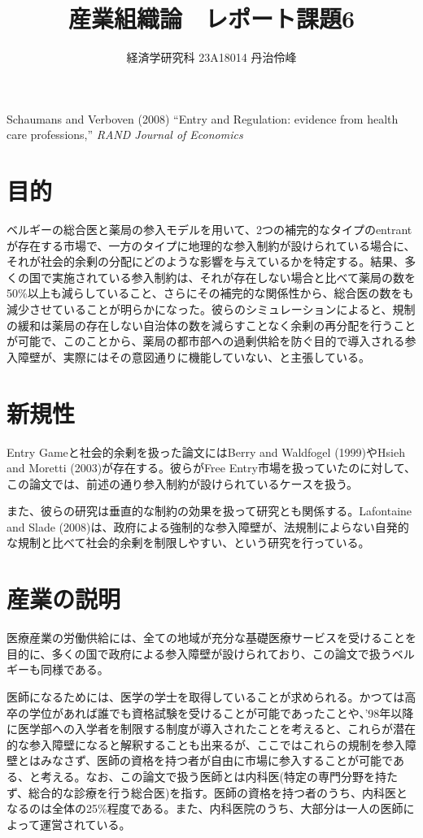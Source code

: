 \documentclass[11pt]{jsarticle}
\begin{document}
\title{産業組織論　レポート課題6}
\author{経済学研究科 23A18014 丹治伶峰}
\date{}
\maketitle

\large
Schaumans and Verboven (2008) ``Entry and Regulation: evidence from health care professions,'' \textit{RAND Journal of Economics}

\normalsize

\section{目的}

ベルギーの総合医と薬局の参入モデルを用いて、2つの補完的なタイプのentrantが存在する市場で、一方のタイプに地理的な参入制約が設けられている場合に、それが社会的余剰の分配にどのような影響を与えているかを特定する。結果、多くの国で実施されている参入制約は、それが存在しない場合と比べて薬局の数を50\%以上も減らしていること、さらにその補完的な関係性から、総合医の数をも減少させていることが明らかになった。彼らのシミュレーションによると、規制の緩和は薬局の存在しない自治体の数を減らすことなく余剰の再分配を行うことが可能で、このことから、薬局の都市部への過剰供給を防ぐ目的で導入される参入障壁が、実際にはその意図通りに機能していない、と主張している。

\section{新規性}

Entry Gameと社会的余剰を扱った論文にはBerry and Waldfogel (1999)やHsieh and Moretti (2003)が存在する。彼らがFree Entry市場を扱っていたのに対して、この論文では、前述の通り参入制約が設けられているケースを扱う。

また、彼らの研究は垂直的な制約の効果を扱って研究とも関係する。Lafontaine and Slade (2008)は、政府による強制的な参入障壁が、法規制によらない自発的な規制と比べて社会的余剰を制限しやすい、という研究を行っている。

\section{産業の説明}

医療産業の労働供給には、全ての地域が充分な基礎医療サービスを受けることを目的に、多くの国で政府による参入障壁が設けられており、この論文で扱うベルギーも同様である。

医師になるためには、医学の学士を取得していることが求められる。かつては高卒の学位があれば誰でも資格試験を受けることが可能であったことや、'98年以降に医学部への入学者を制限する制度が導入されたことを考えると、これらが潜在的な参入障壁になると解釈することも出来るが、ここではこれらの規制を参入障壁とはみなさず、医師の資格を持つ者が自由に市場に参入することが可能である、と考える。なお、この論文で扱う医師とは内科医(特定の専門分野を持たず、総合的な診療を行う総合医)を指す。医師の資格を持つ者のうち、内科医となるのは全体の25\%程度である。また、内科医院のうち、大部分は一人の医師によって運営されている。
\end{document}
